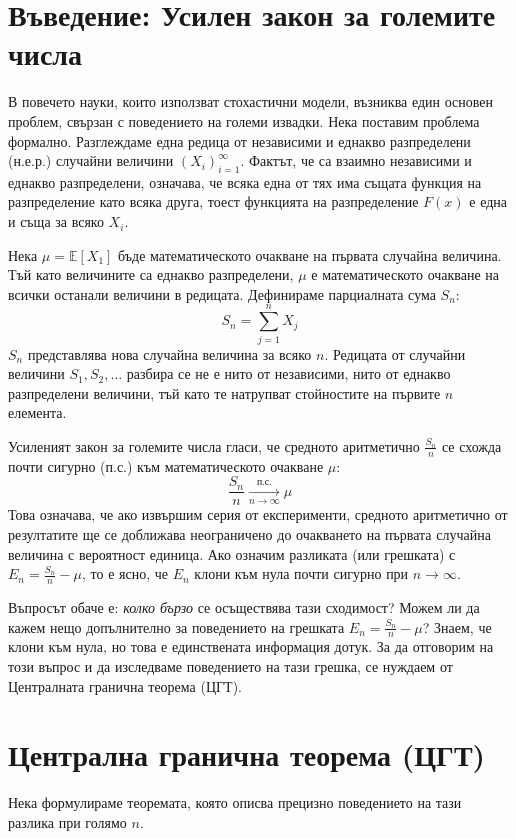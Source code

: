 \documentclass{article}
\begin{document}
\section{Въведение: Усилен закон за големите числа}

В повечето науки, които използват стохастични модели, възниква един основен проблем, свързан с поведението на големи извадки. Нека поставим проблема формално. Разглеждаме една редица от независими и еднакво разпределени (н.е.р.) случайни величини $(X_i)_{i=1}^\infty$. Фактът, че са взаимно независими и еднакво разпределени, означава, че всяка една от тях има същата функция на разпределение като всяка друга, тоест функцията на разпределение $F(x)$ е една и съща за всяко $X_i$.

Нека $\mu = \mathbb{E}[X_1]$ бъде математическото очакване на първата случайна величина. Тъй като величините са еднакво разпределени, $\mu$ е математическото очакване на всички останали величини в редицата. Дефинираме парциалната сума $S_n$:
\[ S_n = \sum_{j=1}^n X_j \]
$S_n$ представлява нова случайна величина за всяко $n$. Редицата от случайни величини $S_1, S_2, \dots$ разбира се не е нито от независими, нито от еднакво разпределени величини, тъй като те натрупват стойностите на първите $n$ елемента.

Усиленият закон за големите числа гласи, че средното аритметично $\frac{S_n}{n}$ се схожда почти сигурно (п.с.) към математическото очакване $\mu$:
\[ \frac{S_n}{n} \xrightarrow[n \to \infty]{\text{п.с.}} \mu \]
Това означава, че ако извършим серия от експерименти, средното аритметично от резултатите ще се доближава неограничено до очакването на първата случайна величина с вероятност единица. Ако означим разликата (или грешката) с $E_n = \frac{S_n}{n} - \mu$, то е ясно, че $E_n$ клони към нула почти сигурно при $n \to \infty$. 

Въпросът обаче е: \textit{колко бързо} се осъществява тази сходимост? Можем ли да кажем нещо допълнително за поведението на грешката $E_n = \frac{S_n}{n} - \mu$? Знаем, че клони към нула, но това е единствената информация дотук. За да отговорим на този въпрос и да изследваме поведението на тази грешка, се нуждаем от Централната гранична теорема (ЦГТ).

\section{Централна гранична теорема (ЦГТ)}

Нека формулираме теоремата, която описва прецизно поведението на тази разлика при голямо $n$.
\end{document}
